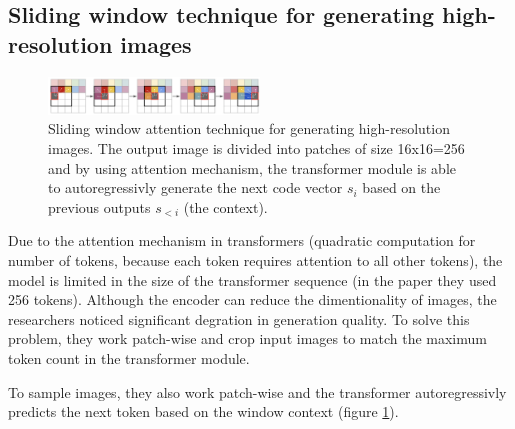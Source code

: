 \subsection{Sliding window technique for generating high-resolution images}

\begin{figure}
    \centering
    \includegraphics[width=0.5\textwidth]{images/vqgan_sliding_attention.png}
    \caption{Sliding window attention technique for generating high-resolution images. The output image is divided into patches of size 16x16=256 and by using attention mechanism, the transformer module is able to autoregressivly generate the next code vector $s_i$ based on the previous outputs $s_{<i}$ (the context).}
    \label{fig:vqgan_sliding_window}
\end{figure}

Due to the attention mechanism in transformers (quadratic computation for number of tokens, because each token requires attention to all other tokens), the model is limited in the size of the transformer sequence (in the paper they used 256 tokens). Although the encoder can reduce the dimentionality of images, the researchers noticed significant degration in generation quality. To solve this problem, they work patch-wise and crop input images to match the maximum token count in the transformer module.

To sample images, they also work patch-wise and the transformer autoregressivly predicts the next token based on the window context (figure \ref{fig:vqgan_sliding_window}).

